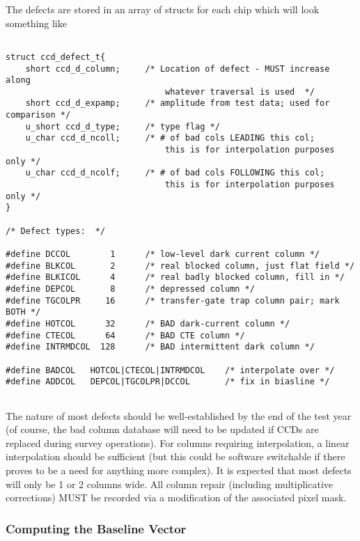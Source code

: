 The defects are stored in an array of structs for each chip which will
look something like
 
\begin{verbatim}

struct ccd_defect_t{
    short ccd_d_column;     /* Location of defect - MUST increase along 
                                whatever traversal is used  */
    short ccd_d_expamp;     /* amplitude from test data; used for comparison */
    u_short ccd_d_type;     /* type flag */
    u_char ccd_d_ncoll;     /* # of bad cols LEADING this col;
                                this is for interpolation purposes only */
    u_char ccd_d_ncolf;     /* # of bad cols FOLLOWING this col;
                                this is for interpolation purposes only */
}
 
/* Defect types:  */

#define DCCOL        1      /* low-level dark current column */
#define BLKCOL       2      /* real blocked column, just flat field */
#define BLKICOL      4      /* real badly blocked column, fill in */
#define DEPCOL       8      /* depressed column */
#define TGCOLPR     16      /* transfer-gate trap column pair; mark BOTH */
#define HOTCOL      32      /* BAD dark-current column */
#define CTECOL      64      /* BAD CTE column */
#define INTRMDCOL  128      /* BAD intermittent dark column */
 
#define BADCOL   HOTCOL|CTECOL|INTRMDCOL    /* interpolate over */
#define ADDCOL   DEPCOL|TGCOLPR|DCCOL       /* fix in biasline */
 
\end{verbatim}

The nature of most defects should be well-established by the end
of the test year (of course, the bad column database will need to
be updated if CCDs are replaced during survey operations).
For columns requiring interpolation, a linear interpolation
should be sufficient (but this could be software switchable
if there proves to be a need for anything more complex).
It is expected that most defects will only be 1 or 2 columns wide.
All column repair (including multiplicative corrections)
MUST be recorded via a modification of the associated pixel mask.

\subsubsection{Computing the Baseline Vector}
 
